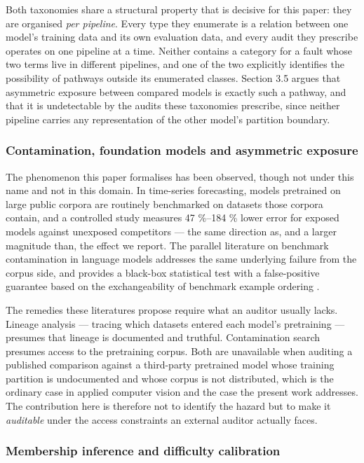 Both taxonomies share a structural property that is decisive for this paper: they are organised \emph{per pipeline}. Every type they enumerate is a relation between one model's training data and its own evaluation data, and every audit they prescribe operates on one pipeline at a time. Neither contains a category for a fault whose two terms live in different pipelines, and one of the two explicitly identifies the possibility of pathways outside its enumerated classes. Section 3.5 argues that asymmetric exposure between compared models is exactly such a pathway, and that it is undetectable by the audits these taxonomies prescribe, since neither pipeline carries any representation of the other model's partition boundary.

\subsubsection{Contamination, foundation models and asymmetric exposure}

The phenomenon this paper formalises has been observed, though not under this name and not in this domain. In time-series forecasting, models pretrained on large public corpora are routinely benchmarked on datasets those corpora contain, and a controlled study  measures 47 \%--184 \% lower error for exposed models against unexposed competitors --- the same direction as, and a larger magnitude than, the effect we report. The parallel literature on benchmark contamination in language models addresses the same underlying failure from the corpus side, and provides a black-box statistical test with a false-positive guarantee based on the exchangeability of benchmark example ordering .

The remedies these literatures propose require what an auditor usually lacks. Lineage analysis --- tracing which datasets entered each model's pretraining --- presumes that lineage is documented and truthful. Contamination search presumes access to the pretraining corpus. Both are unavailable when auditing a published comparison against a third-party pretrained model whose training partition is undocumented and whose corpus is not distributed, which is the ordinary case in applied computer vision and the case the present work addresses. The contribution here is therefore not to identify the hazard but to make it \emph{auditable} under the access constraints an external auditor actually faces.

\subsubsection{Membership inference and difficulty calibration}

